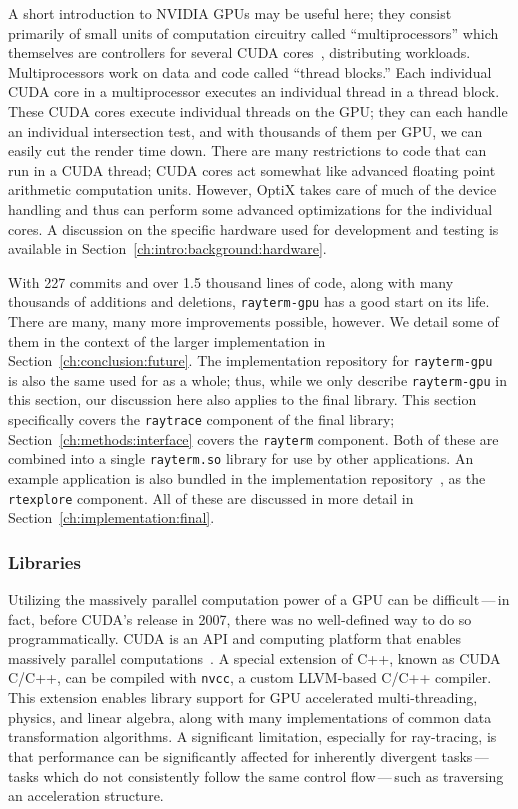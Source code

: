 A short introduction to NVIDIA GPUs may be useful here; they consist primarily of small units of computation circuitry called ``multiprocessors'' which themselves are controllers for several CUDA cores~\cite{fermi2009nvidia}, distributing workloads.
Multiprocessors work on data and code called ``thread blocks.''
Each individual CUDA core in a multiprocessor executes an individual thread in a thread block.
These CUDA cores execute individual threads on the GPU; they can each handle an individual intersection test, and with thousands of them per GPU, we can easily cut the render time down.
There are many restrictions to code that can run in a CUDA thread; CUDA cores act somewhat like advanced floating point arithmetic computation units.
However, OptiX takes care of much of the device handling and thus can perform some advanced optimizations for the individual cores.
A discussion on the specific hardware used for development and testing is available in Section~\ref{ch:intro:background:hardware}.

With 227 commits and over 1.5 thousand lines of code, along with many thousands of additions and deletions, \texttt{rayterm-gpu} has a good start on its life.
There are many, many more improvements possible, however.
We detail some of them in the context of the larger \name{} implementation in Section~\ref{ch:conclusion:future}.
The implementation repository for \texttt{rayterm-gpu}~\cite{raytermGpuImpl} is also the same used for \name{} as a whole; thus, while we only describe \texttt{rayterm-gpu} in this section, our discussion here also applies to the final \name{} library.
This section specifically covers the \texttt{raytrace} component of the final \name{} library; Section~\ref{ch:methods:interface} covers the \texttt{rayterm} component.
Both of these are combined into a single \texttt{rayterm.so} library for use by other applications.
An example application is also bundled in the implementation repository~\cite{raytermGpuImpl}, as the \texttt{rtexplore} component.
All of these are discussed in more detail in Section~\ref{ch:implementation:final}.

\subsubsection{Libraries} \label{ch:methods:renderer:parallel:libraries}

Utilizing the massively parallel computation power of a GPU can be difficult\,---\,in fact, before CUDA's release in 2007, there was no well-defined way to do so programmatically.
CUDA is an API and computing platform that enables massively parallel computations~\cite{nvidia2011cuda}.
A special extension of C++, known as CUDA C/C++, can be compiled with \texttt{nvcc}, a custom LLVM-based C/C++ compiler.
This extension enables library support for GPU accelerated multi-threading, physics, and linear algebra, along with many implementations of common data transformation algorithms.
A significant limitation, especially for ray-tracing, is that performance can be significantly affected for inherently divergent tasks\,---\,tasks which do not consistently follow the same control flow\,---\,such as traversing an acceleration structure.


